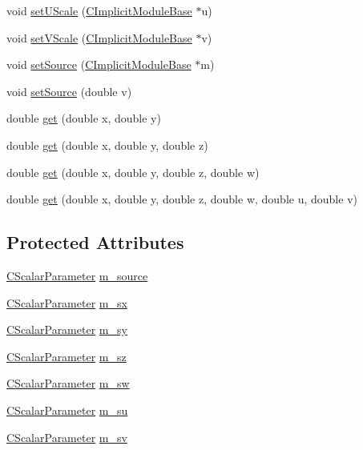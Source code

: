 \begin{DoxyCompactItemize}
\item 
void \hyperlink{classanl_1_1CImplicitScaleDomain_abeaa506433802ff1d131364f310a3037}{setUScale} (\hyperlink{classanl_1_1CImplicitModuleBase}{CImplicitModuleBase} $\ast$u)
\item 
void \hyperlink{classanl_1_1CImplicitScaleDomain_ab696477cd37694f62e6cb1fcee77cecc}{setVScale} (\hyperlink{classanl_1_1CImplicitModuleBase}{CImplicitModuleBase} $\ast$v)
\item 
void \hyperlink{classanl_1_1CImplicitScaleDomain_a2117d954811a30ab92838efa4b90c4f6}{setSource} (\hyperlink{classanl_1_1CImplicitModuleBase}{CImplicitModuleBase} $\ast$m)
\item 
void \hyperlink{classanl_1_1CImplicitScaleDomain_ab0a073259bf5cda4c1601f632ca14432}{setSource} (double v)
\item 
double \hyperlink{classanl_1_1CImplicitScaleDomain_a9f4a9bc6d4cf2af9209123423b83feec}{get} (double x, double y)
\item 
double \hyperlink{classanl_1_1CImplicitScaleDomain_a7dfe0c88e39f22949a8233e60d0bf70c}{get} (double x, double y, double z)
\item 
double \hyperlink{classanl_1_1CImplicitScaleDomain_af53d0c59728d29e9b8cd21b581030b24}{get} (double x, double y, double z, double w)
\item 
double \hyperlink{classanl_1_1CImplicitScaleDomain_aed69393e0a156ec2c0bf385b3e9345e7}{get} (double x, double y, double z, double w, double u, double v)
\end{DoxyCompactItemize}
\subsection*{Protected Attributes}
\begin{DoxyCompactItemize}
\item 
\hyperlink{classanl_1_1CScalarParameter}{CScalarParameter} \hyperlink{classanl_1_1CImplicitScaleDomain_a889fb95433830a2b1910f8201048cb00}{m\_\-source}
\item 
\hyperlink{classanl_1_1CScalarParameter}{CScalarParameter} \hyperlink{classanl_1_1CImplicitScaleDomain_afbde60647f06a8dfccf53868520b3421}{m\_\-sx}
\item 
\hyperlink{classanl_1_1CScalarParameter}{CScalarParameter} \hyperlink{classanl_1_1CImplicitScaleDomain_a472d34499a26f3ee1860b6fbb9fbcf34}{m\_\-sy}
\item 
\hyperlink{classanl_1_1CScalarParameter}{CScalarParameter} \hyperlink{classanl_1_1CImplicitScaleDomain_a2962bc56a536e3641b9a55bfa83c20ec}{m\_\-sz}
\item 
\hyperlink{classanl_1_1CScalarParameter}{CScalarParameter} \hyperlink{classanl_1_1CImplicitScaleDomain_a1ec149de2174686125381fe769d241b7}{m\_\-sw}
\item 
\hyperlink{classanl_1_1CScalarParameter}{CScalarParameter} \hyperlink{classanl_1_1CImplicitScaleDomain_a959368449b4782819546edacae79a79f}{m\_\-su}
\item 
\hyperlink{classanl_1_1CScalarParameter}{CScalarParameter} \hyperlink{classanl_1_1CImplicitScaleDomain_a44a1d1bc9344359f028286cd602c4b02}{m\_\-sv}
\end{DoxyCompactItemize}


